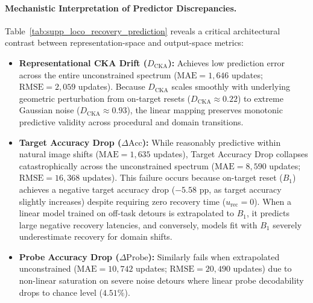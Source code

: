 \documentclass[10pt]{article}
\begin{document}
\paragraph{Mechanistic Interpretation of Predictor Discrepancies.}
Table~\ref{tab:supp_loco_recovery_prediction} reveals a critical architectural contrast between representation-space and output-space metrics:
\begin{itemize}
    \item \textbf{Representational CKA Drift ($D_{\mathrm{CKA}}$):} Achieves low prediction error across the entire unconstrained spectrum ($\mathrm{MAE} = 1{,}646$ updates; $\mathrm{RMSE} = 2{,}059$ updates). Because $D_{\mathrm{CKA}}$ scales smoothly with underlying geometric perturbation from on-target resets ($D_{\mathrm{CKA}} \approx 0.22$) to extreme Gaussian noise ($D_{\mathrm{CKA}} \approx 0.93$), the linear mapping preserves monotonic predictive validity across procedural and domain transitions.
    \item \textbf{Target Accuracy Drop ($\Delta \mathrm{Acc}$):} While reasonably predictive within natural image shifts ($\mathrm{MAE} = 1{,}635$ updates), Target Accuracy Drop collapses catastrophically across the unconstrained spectrum ($\mathrm{MAE} = 8{,}590$ updates; $\mathrm{RMSE} = 16{,}368$ updates). This failure occurs because on-target reset ($B_1$) achieves a negative target accuracy drop ($-5.58$ pp, as target accuracy slightly increases) despite requiring zero recovery time ($u_{\mathrm{rec}} = 0$). When a linear model trained on off-task detours is extrapolated to $B_1$, it predicts large negative recovery latencies, and conversely, models fit with $B_1$ severely underestimate recovery for domain shifts.
    \item \textbf{Probe Accuracy Drop ($\Delta \mathrm{Probe}$):} Similarly fails when extrapolated unconstrained ($\mathrm{MAE} = 10{,}742$ updates; $\mathrm{RMSE} = 20{,}490$ updates) due to non-linear saturation on severe noise detours where linear probe decodability drops to chance level ($4.51\%$).
\end{itemize}
\end{document}
